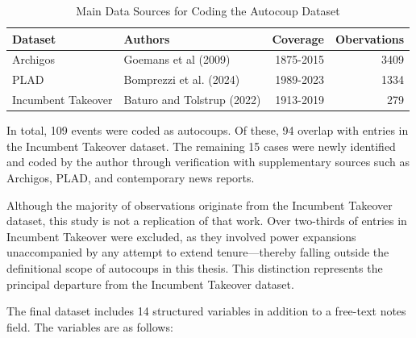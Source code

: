 \documentclass[
  12pt,
]{report}
\begin{document}
\begin{longtable}[]{@{}llrr@{}}

\caption{\label{tbl-source}Main Data Sources for Coding the Autocoup
Dataset}

\tabularnewline

\toprule\noalign{}
Dataset & Authors & Coverage & Obervations \\
\midrule\noalign{}
\endhead
\bottomrule\noalign{}
\endlastfoot
Archigos & Goemans et al (2009) & 1875-2015 & 3409 \\
PLAD & Bomprezzi et al. (2024) & 1989-2023 & 1334 \\
Incumbent Takeover & Baturo and Tolstrup (2022) & 1913-2019 & 279 \\

\end{longtable}

In total, 109 events were coded as autocoups. Of these, 94 overlap with
entries in the Incumbent Takeover dataset. The remaining 15 cases were
newly identified and coded by the author through verification with
supplementary sources such as Archigos, PLAD, and contemporary news
reports.

Although the majority of observations originate from the Incumbent
Takeover dataset, this study is not a replication of that work. Over
two-thirds of entries in Incumbent Takeover were excluded, as they
involved power expansions unaccompanied by any attempt to extend
tenure---thereby falling outside the definitional scope of autocoups in
this thesis. This distinction represents the principal departure from
the Incumbent Takeover dataset.

The final dataset includes 14 structured variables in addition to a
free-text notes field. The variables are as follows:
\end{document}
